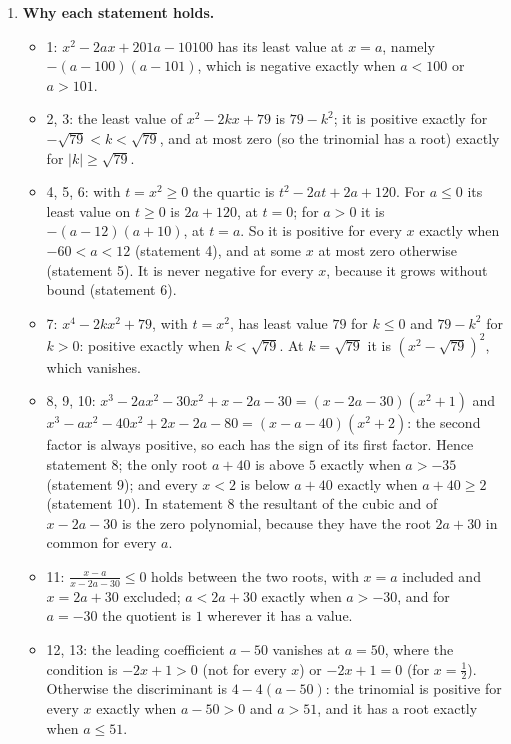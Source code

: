 \documentclass[11pt,a4paper]{article}
\begin{document}
\begin{enumerate}
\item \textbf{Why each statement holds.}
\begin{itemize}
\item 1: $x^{2} - 2ax + 201a - 10100$ has its least value at $x = a$, namely $-(a - 100)(a - 101)$, which is negative exactly when $a < 100$ or $a > 101$.
\item 2, 3: the least value of $x^{2} - 2kx + 79$ is $79 - k^{2}$; it is positive exactly for $-\sqrt{79} < k < \sqrt{79}$, and at most zero (so the trinomial has a root) exactly for $|k| \ge \sqrt{79}$.
\item 4, 5, 6: with $t = x^{2} \ge 0$ the quartic is $t^{2} - 2at + 2a + 120$. For $a \le 0$ its least value on $t \ge 0$ is $2a + 120$, at $t = 0$; for $a > 0$ it is $-(a - 12)(a + 10)$, at $t = a$. So it is positive for every $x$ exactly when $-60 < a < 12$ (statement 4), and at some $x$ at most zero otherwise (statement 5). It is never negative for every $x$, because it grows without bound (statement 6).
\item 7: $x^{4} - 2kx^{2} + 79$, with $t = x^{2}$, has least value $79$ for $k \le 0$ and $79 - k^{2}$ for $k > 0$: positive exactly when $k < \sqrt{79}$. At $k = \sqrt{79}$ it is $(x^{2} - \sqrt{79})^{2}$, which vanishes.
\item 8, 9, 10: $x^{3} - 2ax^{2} - 30x^{2} + x - 2a - 30 = (x - 2a - 30)(x^{2} + 1)$ and $x^{3} - ax^{2} - 40x^{2} + 2x - 2a - 80 = (x - a - 40)(x^{2} + 2)$: the second factor is always positive, so each has the sign of its first factor. Hence statement 8; the only root $a + 40$ is above $5$ exactly when $a > -35$ (statement 9); and every $x < 2$ is below $a + 40$ exactly when $a + 40 \ge 2$ (statement 10). In statement 8 the resultant of the cubic and of $x - 2a - 30$ is the zero polynomial, because they have the root $2a + 30$ in common for every $a$.
\item 11: $\frac{x - a}{x - 2a - 30} \le 0$ holds between the two roots, with $x = a$ included and $x = 2a + 30$ excluded; $a < 2a + 30$ exactly when $a > -30$, and for $a = -30$ the quotient is $1$ wherever it has a value.
\item 12, 13: the leading coefficient $a - 50$ vanishes at $a = 50$, where the condition is $-2x + 1 > 0$ (not for every $x$) or $-2x + 1 = 0$ (for $x = \frac{1}{2}$). Otherwise the discriminant is $4 - 4(a - 50)$: the trinomial is positive for every $x$ exactly when $a - 50 > 0$ and $a > 51$, and it has a root exactly when $a \le 51$.
\end{itemize}


\end{enumerate}
\end{document}
